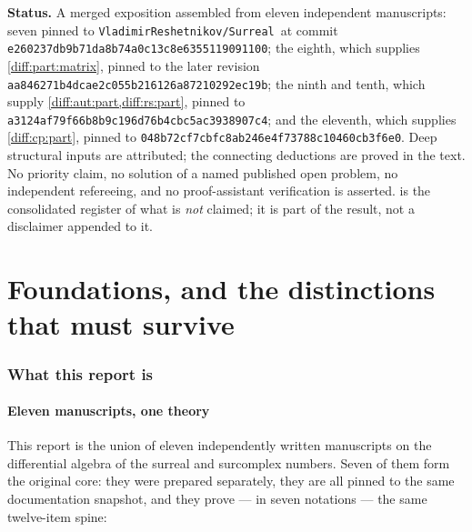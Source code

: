 \documentclass[11pt,letterpaper]{article}
\numberwithin{equation}{section}
\theoremstyle{definition}
\theoremstyle{remark}
\newcommand{\Repo}{\texttt{VladimirReshetnikov/Surreal}}
\newcommand{\Commit}{\nolinkurl{e260237db9b71da8b74a0c13c8e6355119091100}}
\newcommand{\CommitB}{\nolinkurl{aa846271b4dcae2c055b216126a87210292ec19b}}
\newcommand{\CommitC}{\nolinkurl{a3124af79f66b8b9c196d76b4cbc5ac3938907c4}}
\newcommand{\CommitD}{\nolinkurl{048b72cf7cbfc8ab246e4f73788c10460cb3f6e0}}
\begin{document}
\begin{titlepage}
\begin{minipage}{0.93\textwidth}
\begin{abstract}
The Berarducci--Mantova construction is imported, not reproved. Nothing here is
claimed as new, refereed, or machine-checked.
\end{abstract}
\end{minipage}
\vfill
\begin{minipage}{0.93\textwidth}\small
\textbf{Status.} A merged exposition assembled from eleven independent
manuscripts: seven pinned to \Repo\ at commit \Commit; the eighth,
which supplies \cref{diff:part:matrix}, pinned to the later revision
\CommitB; the ninth and tenth, which supply
\cref{diff:aut:part,diff:rs:part}, pinned to \CommitC; and the eleventh,
which supplies \cref{diff:cp:part}, pinned to \CommitD. Deep structural inputs
are attributed; the connecting deductions are proved in the text. No priority
claim, no solution of a named published open problem, no independent
refereeing, and no proof-assistant verification is asserted.
 is the consolidated register of what is
\emph{not} claimed; it is part of the result, not a disclaimer appended to it.
\end{minipage}
\end{titlepage}
\hypersetup{pageanchor=true}
\begingroup\small\setlength{\parskip}{0pt}
\tableofcontents
\endgroup
\clearpage
{}
\part{Foundations, and the distinctions that must survive}
\label{diff:part:foundations}

\section{What this report is}
\label{diff:sec:intro}

\subsection{Eleven manuscripts, one theory}
\label{diff:sub:seven}

This report is the union of eleven independently written manuscripts on the
differential algebra of the surreal and surcomplex numbers. Seven of them form
the original core: they were prepared separately, they are all pinned to the
same documentation snapshot, and they prove --- in seven notations --- the same
twelve-item spine:
\end{document}
